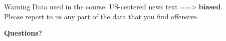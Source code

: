\documentclass[dvipsnames]{beamer}
\begin{document}
%

\begin{frame}{Warning}
    Data used in the course: US-centered news text ==> \textbf{biased}.\\
    Please report to us any part of the data that you find offensive.
\end{frame}

\begin{frame}

\begin{center}
{\huge {\bf Questions?}}
\end{center}
\end{frame}
\end{document}
